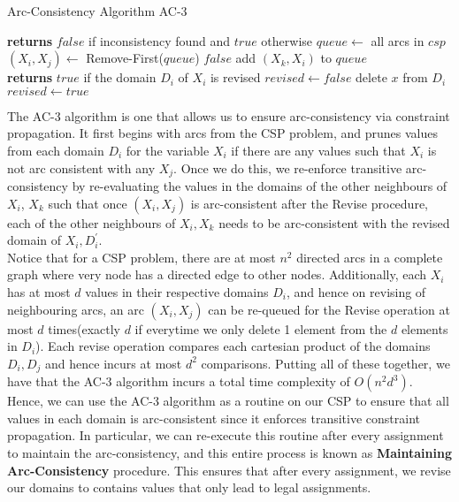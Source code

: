 \documentclass[12pt]{article}
\begin{document}
\begin{algorithm}
\caption{Arc-Consistency Algorithm AC-3}\label{euclid}
\begin{algorithmic}[1]
 \textbf{returns} $false$ if inconsistency found and $true$ otherwise
\State $queue \leftarrow$ all arcs in $csp$
$(X_i, X_j) \leftarrow$ Remove-First($queue$)
 \Return $false$ \EndIf
{}
\State add $(X_k, X_i)$ to $queue$
\EndFor
\EndIf
\EndWhile
\EndProcedure
\\
 \textbf{returns} $true$ if the domain $D_i$ of $X_i$ is revised
\State $revised \leftarrow false$ 
\State delete $x$ from $D_i$
\State $revised \leftarrow true$
\EndIf
\EndFor 
\EndProcedure
\end{algorithmic}
\end{algorithm}

The AC-3 algorithm is one that allows us to ensure arc-consistency via constraint propagation. It first begins with arcs from the CSP problem, and prunes values from each domain $D_i$ for the variable $X_i$ if there are any values such that $X_i$ is not arc consistent with any $X_j$. Once we do this, we re-enforce transitive arc-consistency by re-evaluating the values in the domains of the other neighbours of $X_i$, $X_k$ such that once $(X_i, X_j)$ is arc-consistent after the Revise procedure, each of the other neighbours of $X_i, X_k$ needs to be arc-consistent with the revised domain of $X_i, D_{i}^{'}$.\\

Notice that for a CSP problem, there are at most $n^2$ directed arcs in a complete graph where very node has a directed edge to other nodes. Additionally, each $X_i$ has at most $d$ values in their respective domains $D_i$, and hence on revising of neighbouring arcs, an arc $(X_i, X_j)$ can be re-queued for the Revise operation at most $d$ times(exactly $d$ if everytime we only delete 1 element from the $d$ elements in $D_i$). Each revise operation compares each cartesian product of the domains $D_i, D_j$ and hence incurs at most $d^2$ comparisons. Putting all of these together, we have that the AC-3 algorithm incurs a total time complexity of $O(n^2d^3)$.\\

Hence, we can use the AC-3 algorithm as a routine on our CSP to ensure that all values in each domain is arc-consistent since it enforces transitive constraint propagation. In particular, we can re-execute this routine after every assignment to maintain the arc-consistency, and this entire process is known as \textbf{Maintaining Arc-Consistency} procedure. This ensures that after every assignment, we revise our domains to contains values that only lead to legal assignments.\\
\end{document}
